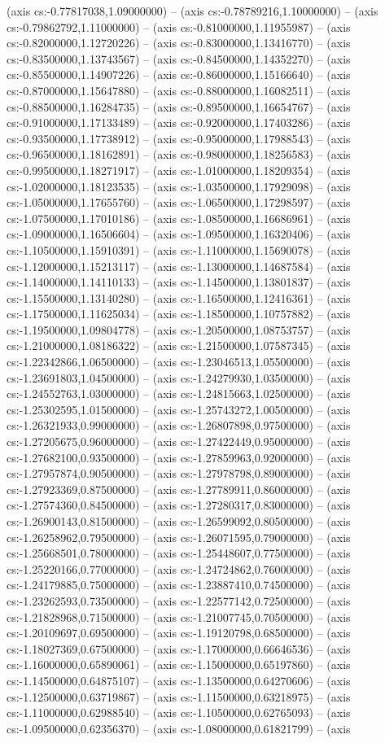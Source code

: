 (axis cs:-0.77817038,1.09000000) -- (axis cs:-0.78789216,1.10000000) -- (axis cs:-0.79862792,1.11000000) -- (axis cs:-0.81000000,1.11955987) -- (axis cs:-0.82000000,1.12720226) -- (axis cs:-0.83000000,1.13416770) -- (axis cs:-0.83500000,1.13743567) -- (axis cs:-0.84500000,1.14352270) -- (axis cs:-0.85500000,1.14907226) -- (axis cs:-0.86000000,1.15166640) -- (axis cs:-0.87000000,1.15647880) -- (axis cs:-0.88000000,1.16082511) -- (axis cs:-0.88500000,1.16284735) -- (axis cs:-0.89500000,1.16654767) -- (axis cs:-0.91000000,1.17133489) -- (axis cs:-0.92000000,1.17403286) -- (axis cs:-0.93500000,1.17738912) -- (axis cs:-0.95000000,1.17988543) -- (axis cs:-0.96500000,1.18162891) -- (axis cs:-0.98000000,1.18256583) -- (axis cs:-0.99500000,1.18271917) -- (axis cs:-1.01000000,1.18209354) -- (axis cs:-1.02000000,1.18123535) -- (axis cs:-1.03500000,1.17929098) -- (axis cs:-1.05000000,1.17655760) -- (axis cs:-1.06500000,1.17298597) -- (axis cs:-1.07500000,1.17010186) -- (axis cs:-1.08500000,1.16686961) -- (axis cs:-1.09000000,1.16506604) -- (axis cs:-1.09500000,1.16320406) -- (axis cs:-1.10500000,1.15910391) -- (axis cs:-1.11000000,1.15690078) -- (axis cs:-1.12000000,1.15213117) -- (axis cs:-1.13000000,1.14687584) -- (axis cs:-1.14000000,1.14110133) -- (axis cs:-1.14500000,1.13801837) -- (axis cs:-1.15500000,1.13140280) -- (axis cs:-1.16500000,1.12416361) -- (axis cs:-1.17500000,1.11625034) -- (axis cs:-1.18500000,1.10757882) -- (axis cs:-1.19500000,1.09804778) -- (axis cs:-1.20500000,1.08753757) -- (axis cs:-1.21000000,1.08186322) -- (axis cs:-1.21500000,1.07587345) -- (axis cs:-1.22342866,1.06500000) -- (axis cs:-1.23046513,1.05500000) -- (axis cs:-1.23691803,1.04500000) -- (axis cs:-1.24279930,1.03500000) -- (axis cs:-1.24552763,1.03000000) -- (axis cs:-1.24815663,1.02500000) -- (axis cs:-1.25302595,1.01500000) -- (axis cs:-1.25743272,1.00500000) -- (axis cs:-1.26321933,0.99000000) -- (axis cs:-1.26807898,0.97500000) -- (axis cs:-1.27205675,0.96000000) -- (axis cs:-1.27422449,0.95000000) -- (axis cs:-1.27682100,0.93500000) -- (axis cs:-1.27859963,0.92000000) -- (axis cs:-1.27957874,0.90500000) -- (axis cs:-1.27978798,0.89000000) -- (axis cs:-1.27923369,0.87500000) -- (axis cs:-1.27789911,0.86000000) -- (axis cs:-1.27574360,0.84500000) -- (axis cs:-1.27280317,0.83000000) -- (axis cs:-1.26900143,0.81500000) -- (axis cs:-1.26599092,0.80500000) -- (axis cs:-1.26258962,0.79500000) -- (axis cs:-1.26071595,0.79000000) -- (axis cs:-1.25668501,0.78000000) -- (axis cs:-1.25448607,0.77500000) -- (axis cs:-1.25220166,0.77000000) -- (axis cs:-1.24724862,0.76000000) -- (axis cs:-1.24179885,0.75000000) -- (axis cs:-1.23887410,0.74500000) -- (axis cs:-1.23262593,0.73500000) -- (axis cs:-1.22577142,0.72500000) -- (axis cs:-1.21828968,0.71500000) -- (axis cs:-1.21007745,0.70500000) -- (axis cs:-1.20109697,0.69500000) -- (axis cs:-1.19120798,0.68500000) -- (axis cs:-1.18027369,0.67500000) -- (axis cs:-1.17000000,0.66646536) -- (axis cs:-1.16000000,0.65890061) -- (axis cs:-1.15000000,0.65197860) -- (axis cs:-1.14500000,0.64875107) -- (axis cs:-1.13500000,0.64270606) -- (axis cs:-1.12500000,0.63719867) -- (axis cs:-1.11500000,0.63218975) -- (axis cs:-1.11000000,0.62988540) -- (axis cs:-1.10500000,0.62765093) -- (axis cs:-1.09500000,0.62356370) -- (axis cs:-1.08000000,0.61821799) -- (axis 
